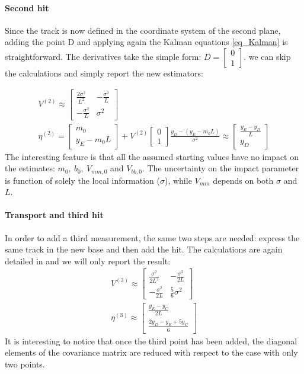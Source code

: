 \begin{refsection}
\paragraph{Second hit} 
Since the track is now defined in the coordinate system of the second plane, 
adding the point D and applying again the Kalman equations \ref{eq_Kalman} is straightforward. 
The derivatives take the simple form: $D=\begin{bmatrix}0\\1\end{bmatrix}$. 
we can skip the calculations and simply report the new estimators:

\begin{equation}
\begin{gathered}
V^{(2)}\approx
\begin{bmatrix}
\frac{2\sigma^2}{L^2} & -\frac{\sigma^2}{L} \\
-\frac{\sigma^2}{L} & \sigma^2
\end{bmatrix}\\
\eta^{(2)} = 
\begin{bmatrix} m_0 \\  y_E-m_0L \end{bmatrix} +
V^{(2)}
\begin{bmatrix} 0\\1 \end{bmatrix}
\frac{y_D-(y_E-m_0L)}{\sigma^2} \approx
\begin{bmatrix} \frac{y_E-y_D}{L} \\ y_D\end{bmatrix}
\end{gathered}
\label{eq_V2}
\end{equation}
The interesting feature is that all the assumed starting values have no impact on the estimates: $m_0,\ b_0,\ V_{mm,0}$ and $V_{bb,0}$. 
The uncertainty on the impact parameter is function of solely the local information ($\sigma$), 
while $V_{mm}$ depends on both $\sigma$ and $L$. 

\paragraph{Transport and third hit} 
In order to add a third measurement, 
the same two steps are needed: 
express the same track in the new base and then add the hit. 
The calculations are again detailed in \cite{KutschkePaper} and we will only report the result:
\begin{gather*}
V^{(3)}\approx
\begin{bmatrix}
\frac{\sigma^2}{2L^2} & -\frac{\sigma^2}{2L} \\
-\frac{\sigma^2}{2L} & \frac{5}{6}\sigma^2
\end{bmatrix}\\
\eta^{(3)} \approx
\begin{bmatrix} \frac{y_E-y_C}{2L} \\ \frac{2y_D-y_E+5y_C}{6}
\end{bmatrix}
\end{gather*}
It is interesting to notice that once the third point has been added, 
the diagonal elements of the covariance matrix are reduced with respect to the case with only two points. 


\end{refsection}

